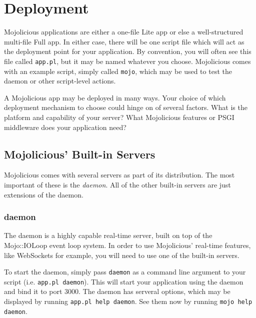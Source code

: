 
\section{Deployment}

Mojolicious applications are either a one-file Lite app
or else a well-structured multi-file Full app.
In either case, there will be one script file which will act as the deployment point for your application.
By convention, you will often see this file called \verb!app.pl!, but it may be named whatever you choose.
Mojolicious comes with an example script, simply called \verb!mojo!, which may be used to test the daemon or other script-level actions.

A Mojolicious app may be deployed in many ways.
Your choice of which deployment mechanism to choose could hinge on of several factors.
What is the platform and capability of your server?
What Mojolicious features or PSGI middleware does your application need?

\subsection{Mojolicious' Built-in Servers}

Mojolicious comes with several servers as part of its distribution.
The most important of these is the \emph{daemon}.
All of the other built-in servers are just extensions of the daemon.

\subsubsection{daemon}

The daemon is a highly capable real-time server, built on top of the Mojo::IOLoop event loop system.
In order to use Mojolicious' real-time features, like WebSockets for example,
you will need to use one of the built-in servers.

To start the daemon, simply pass \verb!daemon! as a command line argument to your script (i.e. \verb!app.pl daemon!). 
This will start your application using the daemon and bind it to port 3000.
The daemon has serveral options, which may be displayed by running \verb!app.pl help daemon!.
See them now by running \verb!mojo help daemon!.

